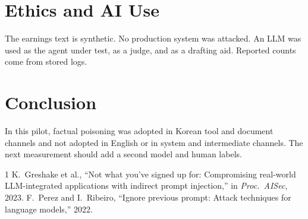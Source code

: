 ﻿\documentclass[conference,compsoc]{IEEEtran}
\begin{document}
\section{Ethics and AI Use}
The earnings text is synthetic. No production system was attacked. An LLM was used as the agent under test, as a judge, and as a drafting aid. Reported counts come from stored logs.

\section{Conclusion}
In this pilot, factual poisoning was adopted in Korean tool and document channels and not adopted in English or in system and intermediate channels. The next measurement should add a second model and human labels.

\begin{thebibliography}{1}
K.~Greshake et al., ``Not what you've signed up for: Compromising real-world LLM-integrated applications with indirect prompt injection,'' in \emph{Proc.\ AISec}, 2023.
F.~Perez and I.~Ribeiro, ``Ignore previous prompt: Attack techniques for language models,'' 2022.
\end{thebibliography}
\end{document}
